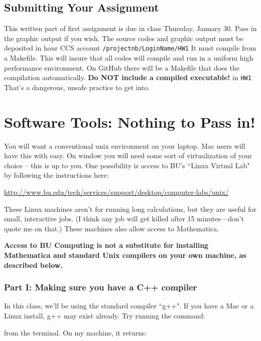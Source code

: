 \documentclass[pdftex,letterpaper,12pt]{article}
\newcommand{\<}{\langle}
\renewcommand{\>}{\rangle}
\newcommand\boxit[1]{\noindent\fbox{ \parbox{16cm}{ #1}}}
\begin{document}
\subsection{Submitting Your Assignment}

This written part of  first assignment is due in class Thursday,
January 30. Pass in the graphic output if you wish. The 
source codes and graphic output  must be deposited in hour CCS account
\verb!/projectnb/LoginName/HW1! It must compile from a Makefile.  This will insure that all codes
will compile and run in a uniform high performance environment. 
On GitHub there will be a Makefile that does the compilation automatically.
{\textbf{Do NOT include a compiled executable!}} in \verb!HW1! That's
a dangerous, unsafe practice to get into. 


\appendix
\section{Software Tools: Nothing to Pass in!}


You will want a conventional unix  environment on your laptop. Mac users
will have this with easy.  On window you will need some sort of
virtualization of your choice -- this is up to you.  One possibility is access to 
BU's ``Linux Virtual Lab" by following the instructions here:

 \url{http://www.bu.edu/tech/services/support/desktop/computer-labs/unix/}

These Linux machines aren't for running long calculations, but they are useful for small, interactive jobs. (I think any job will get killed after 15 minutes---don't quote me on that.) These machines also allow access to Mathematica. 

{\textbf{Access to BU Computing is not a substitute for installing Mathematica and standard Unix compilers on your own machine, as described below.}}


\subsubsection{Part I: Making sure you have a C++ compiler}

In this class, we'll be using the standard compiler ``g++". If you have a Mac or a Linux install, g++ may exist already. Try running the command:

\boxit{
\texttt{which g++}
}

from the terminal. On my machine, it returns:

\boxit{
\texttt{/usr/bin/g++}
}
\end{document}
